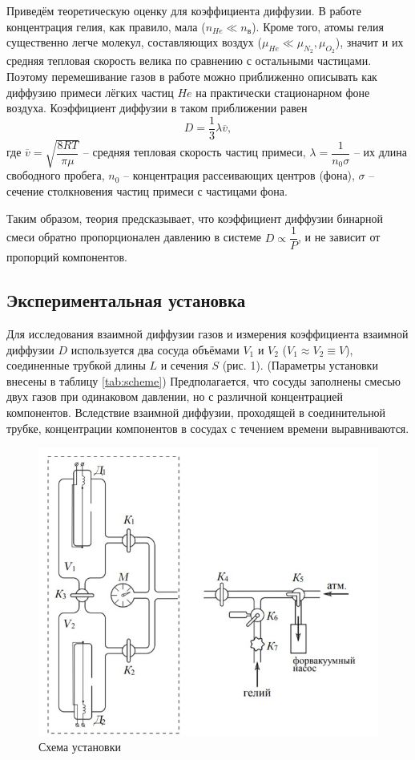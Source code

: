 \documentclass[12pt,a4paper]{article}
\begin{document}
Приведём теоретическую оценку для коэффициента диффузии. В работе концентрация гелия, как правило, мала ($n_{He} \ll n_{\text{в}}$). Кроме того, атомы гелия существенно легче молекул, составляющих воздух ($\mu_{He} \ll \mu_{N_2}, \mu_{O_2}$), значит и их средняя тепловая скорость велика по сравнению с остальными частицами. Поэтому перемешивание газов в работе можно приближенно описывать как диффузию примеси лёгких частиц $He$ на практически стационарном фоне воздуха. Коэффициент диффузии в таком приближении равен 
\begin{equation}\label{eq:lambda}
	D = \dfrac{1}{3} \lambda \overline{v},
\end{equation}
где $\overline{v} = \sqrt{\dfrac{8RT}{\pi \mu}}$ -- средняя тепловая скорость частиц примеси,
$\lambda = \dfrac{1}{n_0 \sigma}$ -- их длина свободного пробега, $n_0$ -- концентрация рассеивающих центров (фона), $\sigma$ -- сечение столкновения частиц примеси с частицами фона.

Таким образом, теория предсказывает, что коэффициент диффузии бинарной смеси обратно пропорционален давлению в системе $D \propto \dfrac{1}{P}$, и не зависит от пропорций компонентов.

\subsection*{Экспериментальная установка}
Для исследования взаимной диффузии газов и измерения коэффициента взаимной диффузии $D$ используется два сосуда объёмами $V_1$ и $V_2$ ($V_1 \approx V_2 \equiv V$), соединенные трубкой длины $L$ и сечения $S$ (рис. 1). (Параметры установки внесены в таблицу \ref{tab:scheme}) Предполагается, что сосуды заполнены смесью двух газов при одинаковом давлении, но с различной концентрацией компонентов. Вследствие взаимной диффузии, проходящей в соединительной трубке, концентрации компонентов в сосудах с течением времени выравниваются.

\begin{figure}[h]
	\centering
	\includegraphics[width=0.8\linewidth]{res/Схема}
	\caption{Схема установки}
	\label{fig:scheme}
\end{figure}
\end{document}
